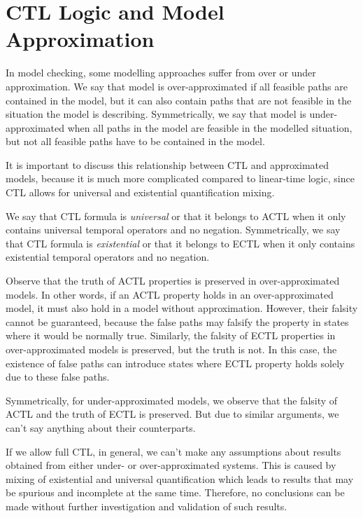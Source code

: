 \documentclass[12pt,oneside]{fithesis2}
\begin{document}
		\section{CTL Logic and Model Approximation}
		
			In model checking, some modelling approaches suffer from over or under approximation. We say that model is over-approximated if all feasible paths are contained in the model, but it can also contain paths that are not feasible in the situation the model is describing. Symmetrically, we say that model is under-approximated when all paths in the model are feasible in the modelled situation, but not all feasible paths have to be contained in the model. 
			
			It is important to discuss this relationship between CTL and approximated models, because it is much more complicated compared to linear-time logic, since CTL allows for universal and existential quantification mixing.
			
			We say that CTL formula is \emph{universal} or that it belongs to ACTL when it only contains universal temporal operators and no negation. Symmetrically, we say that CTL formula is \emph{existential} or that it belongs to ECTL when it only contains existential temporal operators and no negation.
			
			Observe that the truth of ACTL properties is preserved in over-approximated models. In other words, if an ACTL property holds in an over-approximated model, it must also hold in a model without approximation. However, their falsity cannot be guaranteed, because the false paths may falsify the property in states where it would be normally true. Similarly, the falsity of ECTL properties in over-approximated models is preserved, but the truth is not. In this case, the existence of false paths can introduce states where ECTL property holds solely due to these false paths.
			
			Symmetrically, for under-approximated models, we observe that the falsity of ACTL and the truth of ECTL is preserved. But due to similar arguments, we can't say anything about their counterparts.
			
			If we allow full CTL, in general, we can't make any assumptions about results obtained from either under- or over-approximated systems. This is caused by mixing of existential and universal quantification which leads to results that may be spurious and incomplete at the same time. Therefore, no conclusions can be made without further investigation and validation of such results.
			
\end{document}
